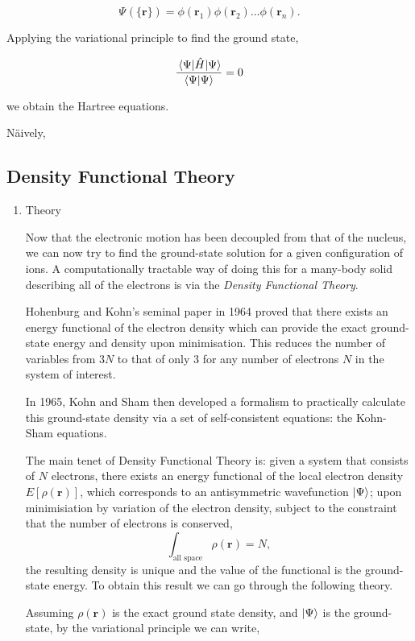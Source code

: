 \documentclass[a4paper,12pt,oneside,print,numbered,index,PageStyleIII]{PhDThesisPSnPDF}
\begin{document}
\[ \Psi_{}(\{\mathbf{r}\}) = \phi(\mathbf{r}_1)\phi(\mathbf{r}_2)\ldots \phi(\mathbf{r}_n). \]

Applying the variational principle to find the ground state,

\[ \frac{ \expval{ \hat{H} }{ \Psi }}{ \bra{\Psi}\ket{\Psi} } = 0 \]

we obtain the Hartree equations.



Näively,

\subsection{Density Functional Theory}
\label{sec:org1f9f4c9}

\begin{enumerate}
\item Theory
\label{sec:orgf430ebb}

Now that the electronic motion has been decoupled from that of the nucleus, we can now try to
find the ground-state solution for a given configuration of ions. A computationally tractable
way of doing this for a many-body solid describing all of the electrons is via the \emph{Density
Functional Theory}.

Hohenburg and Kohn's seminal paper in 1964 proved that there exists an energy functional of the
electron density which can provide the exact ground-state energy and density upon
minimisation. This reduces the number of variables from \(3N\) to that of only 3 for any number
of electrons \(N\) in the system of interest.

In 1965, Kohn and Sham then developed a formalism to practically calculate this ground-state density via
a set of self-consistent equations: the Kohn-Sham equations.

The main tenet of Density Functional Theory is: given a system that consists of \(N\) electrons,
there exists an energy functional of the local electron density \(E[\rho(\mathbf{r})]\), which
corresponds to an antisymmetric wavefunction \(\ket{\Psi}\); upon minimisiation by
variation of the electron density, subject to the constraint that the number of electrons is
conserved, \[ \int_{\text{all space}} \rho(\mathbf{r}) = N, \] the resulting density is unique
and the value of the functional is the ground-state energy. To obtain this result we can go
through the following theory.

Assuming \(\rho(\mathbf{r})\) is the exact ground state density, and \(\ket{\Psi}\)
is the ground-state, by the variational principle we can write,


\end{enumerate}
\end{document}

